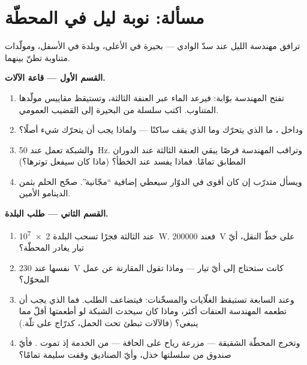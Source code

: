 \section{مسألة: نوبة ليل في المحطّة}

\begin{problem}\label{pb:g9:alternator:1}
ترافق مهندسة الليل عند سدّ الوادي --- بحيرة في الأعلى، وبلدة
في الأسفل، ومولّدات متناوبة تطنّ بينهما.

\medskip\noindent\textbf{القسم الأول --- قاعة الآلات.}
\begin{enumerate}
  \item تفتح المهندسة بوّابة: فيرعد الماء عبر العنفة الثالثة،
        وتستيقظ مقاييس مولّدها المتناوب. اكتب سلسلة  من
        البحيرة إلى القضيب العمومي.
  \item وداخل ، ما الذي يتحرّك وما الذي يقف
        ساكنًا --- ولماذا يجب أن يتحرّك شيء أصلًا؟
  \item والشبكة تعمل عند \qty{50}{Hz}. وتراقب المهندسة قرصًا
        يبقي العنفة الثالثة عند الدوران المطابق تمامًا. فماذا
        يفسد عند  الخطأ؟ (ماذا كان سيفعل 
        توترها؟)
  \item ويسأل متدرّب إن كان  أقوى في الدوّار سيعطي
         إضافية ``مجّانية''. صحّح الحلم بثمن الدينامو
        الأمين.
\end{enumerate}

\medskip\noindent\textbf{القسم الثاني --- طلب البلدة.}
\begin{enumerate}[resume]
  \item عند الثالثة فجرًا تسحب البلدة \qty{2e7}{W}. فعند
        \qty{200000}{V} على خطّ النقل، أيّ تيار يغادر
        المحطّة؟
  \item {} نفسها عند \qty{230}{V} كانت ستحتاج إلى أيّ
        تيار --- وماذا تقول المقارنة عن عمل المحوّل؟
  \item وعند السابعة تستيقظ الغلّايات والمسخّنات: فيتضاعف
        الطلب. فما الذي يجب أن تطعمه المهندسة العنفات أكثر،
        وماذا كان سيحدث  الشبكة لو أطعمتها أقلّ مما
        ينبغي؟ (فالآلات تبطئ تحت الحمل، كدرّاج على تلّة.)
  \item وتخرج المحطّة الشقيقة --- مزرعة رياح على الحافة ---
        من الخدمة إذ تموت . فأيّ صندوق من سلسلتها خذل،
        وأيّ الصناديق وقفت سليمة تمامًا؟
\end{enumerate}


\end{problem}
